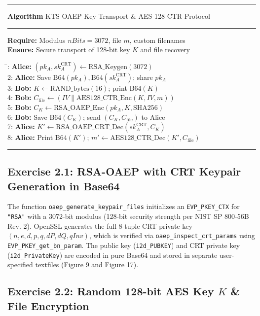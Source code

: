 \documentclass[10pt,twocolumn,letterpaper]{article}
\newcounter{algocount}
\newenvironment{labalgorithm}[1]{%
    \refstepcounter{algocount}%
    \par\vspace{0.5em}\noindent%
    \rule{\columnwidth}{0.8pt}\par\vspace{-0.4em}%
    \noindent\textbf{Algorithm \thealgocount} #1\par\vspace{-0.5em}%
    \noindent\rule{\columnwidth}{0.4pt}\par\vspace{0.2em}%
    \small\noindent%
}{%
    \par\vspace{-0.3em}\noindent\rule{\columnwidth}{0.8pt}\par\vspace{0.5em}%
}
\begin{document}
\begin{labalgorithm}{KTS-OAEP Key Transport \& AES-128-CTR Protocol}
\textbf{Require:} Modulus $nBits = 3072$, file $m$, custom filenames\\
\textbf{Ensure:} Secure transport of 128-bit key $K$ and file recovery
\begin{tabbing}
\hspace{1.0em} \= : \textbf{Alice:} $(pk_A, sk_A^{\text{CRT}}) \leftarrow \text{RSA\_Keygen}(3072)$ \\
2: \textbf{Alice:} Save $\text{B64}(pk_A), \text{B64}(sk_A^{\text{CRT}})$; share $pk_A$ \\
3: \textbf{Bob:} $K \leftarrow \text{RAND\_bytes}(16)$; print $\text{B64}(K)$ \\
4: \textbf{Bob:} $C_{\text{file}} \leftarrow (IV \parallel \text{AES128\_CTR\_Enc}(K, IV, m))$ \\
5: \textbf{Bob:} $C_K \leftarrow \text{RSA\_OAEP\_Enc}(pk_A, K, \text{SHA256})$ \\
6: \textbf{Bob:} Save $\text{B64}(C_K)$; send $(C_K, C_{\text{file}})$ to Alice \\
7: \textbf{Alice:} $K' \leftarrow \text{RSA\_OAEP\_CRT\_Dec}(sk_A^{\text{CRT}}, C_K)$ \\
8: \textbf{Alice:} Print $\text{B64}(K')$; $m' \leftarrow \text{AES128\_CTR\_Dec}(K', C_{\text{file}})$
\end{tabbing}
\end{labalgorithm}

\subsection{Exercise 2.1: RSA-OAEP with CRT Keypair Generation in Base64}

The function \texttt{oaep\_generate\_keypair\_files} initializes an \texttt{EVP\_PKEY\_CTX} for \texttt{"RSA"} with a 3072-bit modulus (128-bit security strength per NIST SP 800-56B Rev. 2). OpenSSL generates the full 8-tuple CRT private key $(n, e, d, p, q, dP, dQ, qInv)$, which is verified via \texttt{oaep\_inspect\_crt\_params} using \texttt{EVP\_PKEY\_get\_bn\_param}. The public key (\texttt{i2d\_PUBKEY}) and CRT private key (\texttt{i2d\_PrivateKey}) are encoded in pure Base64 and stored in separate user-specified textfiles (Figure 9 and Figure 17).

\subsection{Exercise 2.2: Random 128-bit AES Key $K$ \& File Encryption}
\end{document}
